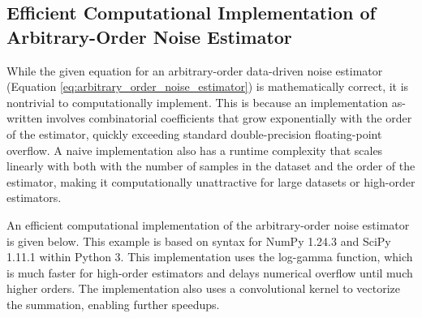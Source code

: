\newpage

\subsection{Efficient Computational Implementation of Arbitrary-Order Noise Estimator}
\label{sec:estimator_code_example}

While the given equation for an arbitrary-order data-driven noise estimator (Equation \ref{eq:arbitrary_order_noise_estimator}) is mathematically correct, it is nontrivial to computationally implement. This is because an implementation as-written involves combinatorial coefficients that grow exponentially with the order of the estimator, quickly exceeding standard double-precision floating-point overflow. A naive implementation also has a runtime complexity that scales linearly with both with the number of samples in the dataset and the order of the estimator, making it computationally unattractive for large datasets or high-order estimators.

An efficient computational implementation of the arbitrary-order noise estimator is given below. This example is based on syntax for NumPy 1.24.3 and SciPy 1.11.1 within Python 3. This implementation uses the log-gamma function, which is much faster for high-order estimators and delays numerical overflow until much higher orders. The implementation also uses a convolutional kernel to vectorize the summation, enabling further speedups.

